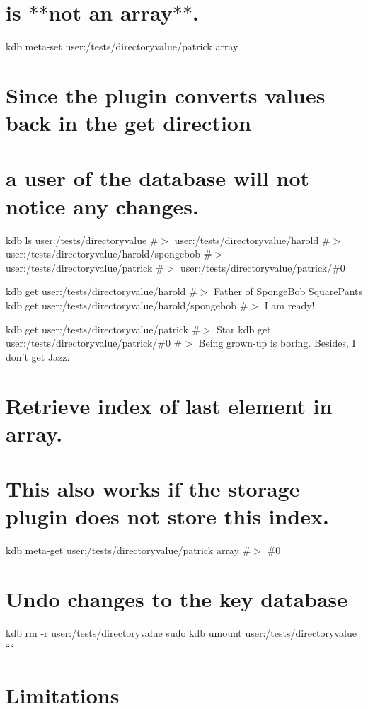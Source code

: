 \hypertarget{autotoc_md173_autotoc_md185}{}\section{is $\ast$$\ast$not an array$\ast$$\ast$.}\label{autotoc_md173_autotoc_md185}
kdb meta-\/set user\+:/tests/directoryvalue/patrick array \textquotesingle{}\textquotesingle{}\hypertarget{autotoc_md173_autotoc_md186}{}\section{Since the plugin converts values back in the get direction}\label{autotoc_md173_autotoc_md186}
\hypertarget{autotoc_md173_autotoc_md187}{}\section{a user of the database will not notice any changes.}\label{autotoc_md173_autotoc_md187}
kdb ls user\+:/tests/directoryvalue \#$>$ user\+:/tests/directoryvalue/harold \#$>$ user\+:/tests/directoryvalue/harold/spongebob \#$>$ user\+:/tests/directoryvalue/patrick \#$>$ user\+:/tests/directoryvalue/patrick/\#0

kdb get user\+:/tests/directoryvalue/harold \#$>$ Father of Sponge\+Bob Square\+Pants kdb get user\+:/tests/directoryvalue/harold/spongebob \#$>$ I am ready!

kdb get user\+:/tests/directoryvalue/patrick \#$>$ Star kdb get user\+:/tests/directoryvalue/patrick/\#0 \#$>$ Being grown-\/up is boring. Besides, I don’t get Jazz.\hypertarget{autotoc_md173_autotoc_md188}{}\section{Retrieve index of last element in array.}\label{autotoc_md173_autotoc_md188}
\hypertarget{autotoc_md173_autotoc_md189}{}\section{This also works if the storage plugin does not store this index.}\label{autotoc_md173_autotoc_md189}
kdb meta-\/get user\+:/tests/directoryvalue/patrick array \#$>$ \#0\hypertarget{autotoc_md173_autotoc_md190}{}\section{Undo changes to the key database}\label{autotoc_md173_autotoc_md190}
kdb rm -\/r user\+:/tests/directoryvalue sudo kdb umount user\+:/tests/directoryvalue ```\hypertarget{autotoc_md173_autotoc_md191}{}\section{Limitations}\label{autotoc_md173_autotoc_md191}

